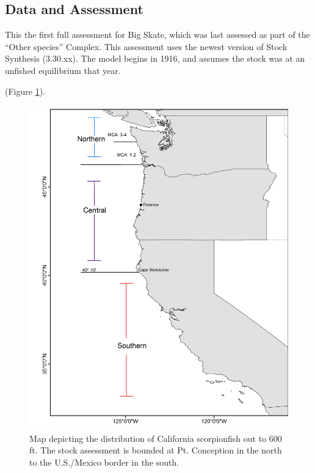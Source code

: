 \documentclass[12pt,]{article}
\begin{document}
\FloatBarrier

\newpage

\hypertarget{data-and-assessment}{%
\subsection*{Data and Assessment}\label{data-and-assessment}}

This the first full assessment for Big Skate, which was last assessed as
part of the ``Other species'' Complex. This assessment uses the newest
version of Stock Synthesis (3.30.xx). The model begins in 1916, and
assumes the stock was at an unfished equilibrium that year.

(Figure \ref{fig:assess_region_map}).

\begin{figure}
\centering
\includegraphics{Figures/assess_region_map.png}
\caption{Map depicting the distribution of California scorpionfish out
to 600 ft. The stock assessment is bounded at Pt. Conception in the
north to the U.S./Mexico border in the south.
\label{fig:assess_region_map}}
\end{figure}
\end{document}
